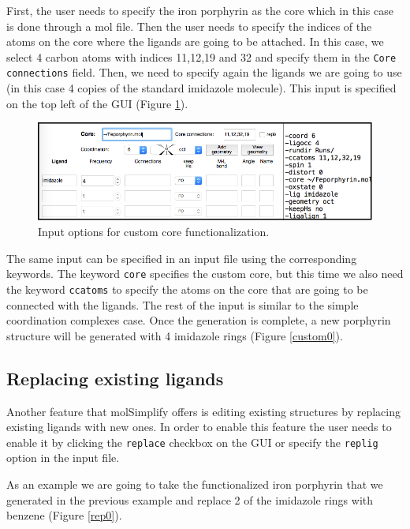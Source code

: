 \documentclass[a4paper,12pt]{assignment}
\begin{document}
First, the user needs to specify the iron porphyrin as the core which in this case is done through a mol file. Then the user needs to specify the indices of the atoms on the core where the ligands are going to be attached. In this case, we select 4 carbon atoms with indices 11,12,19 and 32 and specify them in the \texttt{Core connections} field. Then, we need to specify again the ligands we are going to use (in this case 4 copies of the standard imidazole molecule). This input is specified on the top left of the GUI (Figure \ref{custom1}).

\begin{figure}[htb!]
\centering
\includegraphics[width=\textwidth]{./Figures/fig4b.png}
\caption{Input options for custom core functionalization.}
\label{custom1}
\end{figure}

The same input can be specified in an input file using the corresponding keywords. The keyword \texttt{core} specifies the custom core, but this time we also need the keyword \texttt{ccatoms} to specify the atoms on the core that are going to be connected with the ligands. The rest of the input is similar to the simple coordination complexes case. Once the generation is complete, a new porphyrin structure will be generated with 4 imidazole rings (Figure \ref{custom0}).



\subsection{Replacing existing ligands}

Another feature that molSimplify offers is editing existing structures by replacing existing ligands with new ones. In order to enable this feature the user needs to enable it by clicking the \texttt{replace} checkbox on the GUI or specify the \texttt{replig} option in the input file.

As an example we are going to take the functionalized iron porphyrin that we generated in the previous example and replace 2 of the imidazole rings with benzene (Figure \ref{rep0}). 
\end{document}
